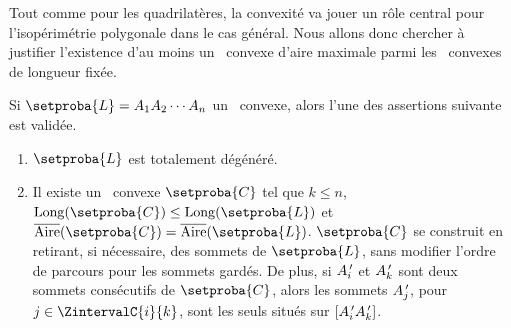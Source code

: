 Tout comme pour les quadrilatères, la convexité va jouer un rôle central pour l’isopérimétrie polygonale dans le cas général.
Nous allons donc chercher à justifier l'existence d'au moins un \ngone\ convexe d'aire maximale parmi les \ngones\ convexes de longueur fixée.




\newpage

\begin{fact} \label{conv-from-non-neg-det}
    Si $\setproba{L} = A_1 A_2 \cdots A_n$ un \ncycle\ convexe, alors l'une des assertions suivante est validée.
	\begin{enumerate}
		\item $\setproba{L}$ est totalement dégénéré.

		\item Il existe un \kgone\ convexe $\setproba{C}$ tel que
		$k \leq n$, 
		$\cyclelen{\setproba{C}} \leq \cyclelen{\setproba{L}}$
		et
		$\sarea{\setproba{C}} = \sarea{\setproba{L}}$.
		$\setproba{C}$ se construit en retirant, si nécessaire, des sommets de $\setproba{L}$, sans modifier l'ordre de parcours pour les sommets gardés.
		De plus,
		si $A^{\,\prime}_i$ et $A^{\,\prime}_k$ sont deux sommets consécutifs de $\setproba{C}$,
		alors les sommets $A^{\,\prime}_j$, pour $j \in \ZintervalC{i}{k}$, sont les seuls situés sur $[A^{\,\prime}_i A^{\,\prime}_k]$.
    \end{enumerate}
\end{fact}


